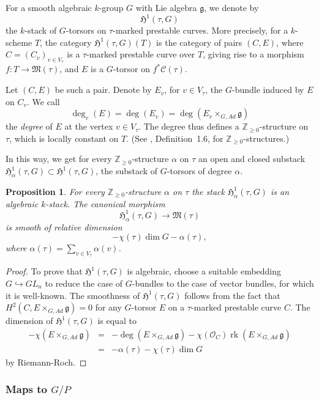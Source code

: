 \documentclass[11pt]{article}
\newcommand{\Gg}{\mathfrak{g}}
\newcommand{\HH}{\mathfrak{H}}
\newcommand{\MM}{\mathfrak{M}}
\renewcommand{\O}{\mathcal{O}}
\newcommand{\cC}{\mathcal{C}}
\DeclareMathOperator{\rk}{rk}
\renewcommand{\t}{_{\tau}}
\newcommand{\upst}{^{\ast}}
\newcommand{\zz}{\mathbb{Z}}
\theoremstyle{plain}
\newtheorem{prop}{Proposition}
\theoremstyle{remark}
\newenvironment{pf}{\begin{proof}}{\end{proof}}
\theoremstyle{plain}
\theoremstyle{definition}
\theoremstyle{remark}
\begin{document}
For a smooth algebraic \(k\)-group \(G\) with Lie algebra \(\Gg\), we denote
by
\[
\HH^1(\tau,G)
\]
the \(k\)-stack of \(G\)-torsors on \(\tau\)-marked prestable curves. More
precisely, for a \(k\)-scheme \(T\), the category
\(\HH^1(\tau,G)(T)\) is the category of pairs \((C,E)\),
where \(C=(C_v)_{v\in V\t}\) is a \(\tau\)-marked prestable curve over
\(T\), giving rise to a morphism \(f:T\rightarrow\MM(\tau)\), and \(E\) is a
\(G\)-torsor on \(f\upst\cC(\tau)\).

Let \((C,E)\) be such a pair. Denote by \(E_v\), for \(v\in V\t\), the
\(G\)-bundle induced by \(E\) on \(C_v\). We call
\[
\deg_v(E)=\deg(E_v)=\deg(E_v\times_{G,Ad}\Gg)
\]
the {\em degree }of \(E\) at the vertex \(v\in V\t\). The degree thus
defines a \(\zz_{\geq0}\)-structure on \(\tau\), which is locally constant
on \(T\). (See \cite{BM}, Definition~1.6, for \(\zz_{\geq0}\)-structures.)

In this way, we get for every \(\zz_{\geq0}\)-structure \(\alpha\) on
\(\tau\) an open and closed substack
\(\HH^1_{\alpha}(\tau,G)
\subset\HH^1(\tau,G)\),
the substack of \(G\)-torsors of degree \(\alpha\).

\begin{prop} \label{h1sd}
For every \(\zz_{\geq0}\)-structure \(\alpha\) on \(\tau\) the stack
\(\HH^1_{\alpha}(\tau,G)\) is an algebraic \(k\)-stack.
The canonical morphism
\[
\HH^1_{\alpha}(\tau,G)\longrightarrow\MM(\tau)
\]
is smooth of relative dimension
\[
-\chi(\tau)\dim G-\alpha(\tau),
\]
where \(\alpha(\tau)=\sum_{v \in V\t}\alpha(v)\).
\end{prop}
\begin{pf}
To prove that \(\HH^1(\tau,G)\) is algebraic, choose a suitable
embedding \(G\hookrightarrow GL_n\) to reduce the case of \(G\)-bundles to the
case of vector bundles, for which it is well-known. The smoothness of
\(\HH^1(\tau,G)\) follows from the fact that
\(H^2(C,E\times_{G,Ad}\Gg)=0\) for any \(G\)-torsor \(E\) on a \(\tau\)-marked
prestable curve \(C\). The dimension of \(\HH^1(\tau,G)\) is equal to
\begin{eqnarray*}
-\chi(E\times_{G,Ad}\Gg)& = &
-\deg(E\times_{G,Ad}\Gg)-\chi(\O_C)\rk(E\times_{G,Ad}\Gg) \\
&=& -\alpha(\tau)-\chi(\tau)\dim G
\end{eqnarray*}
by Riemann-Roch.
\end{pf}

\subsubsection{Maps to \texorpdfstring{\(G/P\)}{G/P}}
\end{document}
